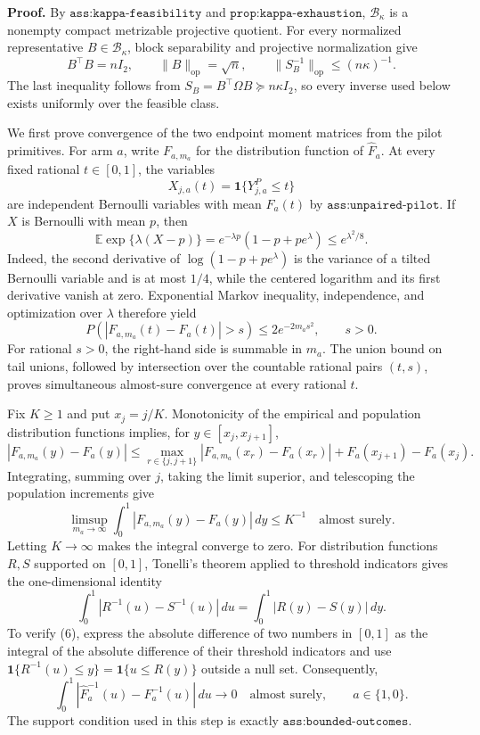 \textbf{Proof.}
By \(\texttt{ass:kappa-feasibility}\) and \(\texttt{prop:kappa-exhaustion}\), \(\mathcal B_\kappa\) is a nonempty compact metrizable projective quotient.  For every normalized representative \(B\in\mathcal B_\kappa\), block separability and projective normalization give
\[
B^{\top}B=nI_2,
\qquad
\lVert B\rVert_{\mathrm{op}}=\sqrt n,
\qquad
\lVert S_B^{-1}\rVert_{\mathrm{op}}\le (n\kappa)^{-1}.
\tag{1}
\]
The last inequality follows from \(S_B=B^{\top}\Omega B\succeq n\kappa I_2\), so every inverse used below exists uniformly over the feasible class.

We first prove convergence of the two endpoint moment matrices from the pilot primitives.  For arm \(a\), write \(F_{a,m_a}\) for the distribution function of \(\widehat F_a\).  At every fixed rational \(t\in[0,1]\), the variables
\[
X_{j,a}(t)=\mathbf 1\{Y^P_{j,a}\le t\}
\]
are independent Bernoulli variables with mean \(F_a(t)\) by \(\texttt{ass:unpaired-pilot}\).  If \(X\) is Bernoulli with mean \(p\), then
\[
\mathbb E\exp\{\lambda(X-p)\}
=e^{-\lambda p}(1-p+pe^\lambda)\le e^{\lambda^2/8}.
\tag{2}
\]
Indeed, the second derivative of \(\log(1-p+pe^\lambda)\) is the variance of a tilted Bernoulli variable and is at most \(1/4\), while the centered logarithm and its first derivative vanish at zero.  Exponential Markov inequality, independence, and optimization over \(\lambda\) therefore yield
\[
P\!\left(\left|F_{a,m_a}(t)-F_a(t)\right|>s\right)
\le 2e^{-2m_as^2},
\qquad s>0.
\tag{3}
\]
For rational \(s>0\), the right-hand side is summable in \(m_a\).  The union bound on tail unions, followed by intersection over the countable rational pairs \((t,s)\), proves simultaneous almost-sure convergence at every rational \(t\).

Fix \(K\ge1\) and put \(x_j=j/K\).  Monotonicity of the empirical and population distribution functions implies, for \(y\in[x_j,x_{j+1}]\),
\[
|F_{a,m_a}(y)-F_a(y)|
\le
\max_{r\in\{j,j+1\}}|F_{a,m_a}(x_r)-F_a(x_r)|
+F_a(x_{j+1})-F_a(x_j).
\tag{4}
\]
Integrating, summing over \(j\), taking the limit superior, and telescoping the population increments give
\[
\limsup_{m_a\to\infty}
\int_0^1|F_{a,m_a}(y)-F_a(y)|\,dy\le K^{-1}
\quad\text{almost surely}.
\tag{5}
\]
Letting \(K\to\infty\) makes the integral converge to zero.  For distribution functions \(R,S\) supported on \([0,1]\), Tonelli's theorem applied to threshold indicators gives the one-dimensional identity
\[
\int_0^1|R^{-1}(u)-S^{-1}(u)|\,du
=\int_0^1|R(y)-S(y)|\,dy.
\tag{6}
\]
To verify (6), express the absolute difference of two numbers in \([0,1]\) as the integral of the absolute difference of their threshold indicators and use
\(\mathbf 1\{R^{-1}(u)\le y\}=\mathbf 1\{u\le R(y)\}\) outside a null set.  Consequently,
\[
\int_0^1|\widehat F_a^{-1}(u)-F_a^{-1}(u)|\,du\longrightarrow0
\quad\text{almost surely},
\qquad a\in\{1,0\}.
\tag{7}
\]
The support condition used in this step is exactly \(\texttt{ass:bounded-outcomes}\).

